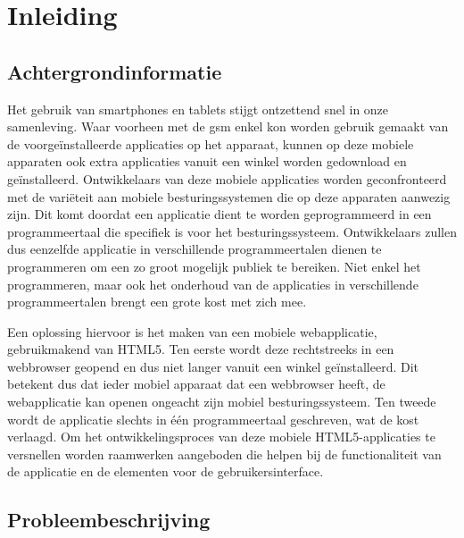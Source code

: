 \chapter{Inleiding} 
\label{inleiding}

\section{Achtergrondinformatie}

Het gebruik van smartphones en tablets stijgt ontzettend snel in onze samenleving.
Waar voorheen met de gsm enkel kon worden gebruik gemaakt van de voorgeïnstalleerde applicaties op het apparaat, kunnen op deze mobiele apparaten ook extra applicaties vanuit een winkel worden gedownload en geïnstalleerd.
Ontwikkelaars van deze mobiele applicaties worden geconfronteerd met de variëteit aan mobiele besturingssystemen die op deze apparaten aanwezig zijn.
Dit komt doordat een applicatie dient te worden geprogrammeerd in een programmeertaal die specifiek is voor het besturingssysteem.
Ontwikkelaars zullen dus eenzelfde applicatie in verschillende programmeertalen dienen te programmeren om een zo groot mogelijk publiek te bereiken.
Niet enkel het programmeren, maar ook het onderhoud van de applicaties in verschillende programmeertalen brengt een grote kost met zich mee.

Een oplossing hiervoor is het maken van een mobiele webapplicatie, gebruikmakend van HTML5.
Ten eerste wordt deze rechtstreeks in een webbrowser geopend en dus niet langer vanuit een winkel geïnstalleerd.
Dit betekent dus dat ieder mobiel apparaat dat een webbrowser heeft, de webapplicatie kan openen ongeacht zijn mobiel besturingssysteem.
Ten tweede wordt de applicatie slechts in één programmeertaal geschreven, wat de kost verlaagd.
Om het ontwikkelingsproces van deze mobiele HTML5-applicaties te versnellen worden raamwerken aangeboden die helpen bij de functionaliteit van de applicatie en de elementen voor de gebruikersinterface. 

\section{Probleembeschrijving}

